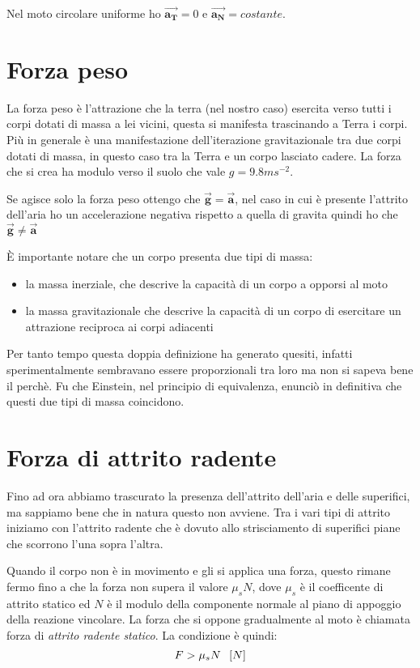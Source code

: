 \documentclass[class=book, crop=false, oneside, 12pt]{standalone}
\begin{document}
Nel moto circolare uniforme ho \(\overrightarrow{\mathbf{a_T}} = 0\) e \(\overrightarrow{\mathbf{a_N}} = costante\).

\section{Forza peso}

La forza peso è l'attrazione che la terra (nel nostro caso) esercita verso tutti i corpi dotati di massa a lei vicini, questa si manifesta trascinando a Terra i corpi. 
Più in generale è una manifestazione dell'iterazione gravitazionale tra due corpi dotati di massa, in questo caso tra la Terra e un corpo lasciato cadere.
La forza che si crea ha modulo verso il suolo che vale \(g = 9.8 ms^{-2}\).

Se agisce solo la forza peso ottengo che \(\overrightarrow{\mathbf{g}} = \overrightarrow{\mathbf{a}}\), 
nel caso in cui è presente l'attrito dell'aria ho un accelerazione negativa rispetto a quella di gravita quindi ho che \(\overrightarrow{\mathbf{g}} \neq \overrightarrow{\mathbf{a}}\)

È importante notare che un corpo presenta due tipi di massa:
\begin{itemize}
    \item la massa inerziale, che descrive la capacità di un corpo a opporsi al moto
    \item la massa gravitazionale che descrive la capacità di un corpo di esercitare un attrazione reciproca ai corpi adiacenti
\end{itemize}
Per tanto tempo questa doppia definizione ha generato quesiti, infatti sperimentalmente sembravano essere proporzionali tra loro ma non si sapeva bene il perchè.
Fu che Einstein, nel principio di equivalenza, enunciò in definitiva che questi due tipi di massa coincidono.

\section{Forza di attrito radente}

Fino ad ora abbiamo trascurato la presenza dell'attrito dell'aria e delle superifici, ma sappiamo bene che in natura questo non avviene.
Tra i vari tipi di attrito iniziamo con l'attrito radente che è dovuto allo strisciamento di superifici piane che scorrono l'una sopra l'altra.

Quando il corpo non è in movimento e gli si applica una forza, questo rimane fermo fino a che la forza non supera il valore \(\mu_s N\), 
dove \(\mu_s\) è il coefficente di attrito statico ed \(N\) è il modulo della componente normale al piano di appoggio della reazione vincolare.
La forza che si oppone gradualmente al moto è chiamata forza di \emph{attrito radente statico}.
La condizione è quindi:
\begin{equation*}
    F > \mu_s N \hspace{0.2cm} \left[N\right]
\end{equation*}
\end{document}
